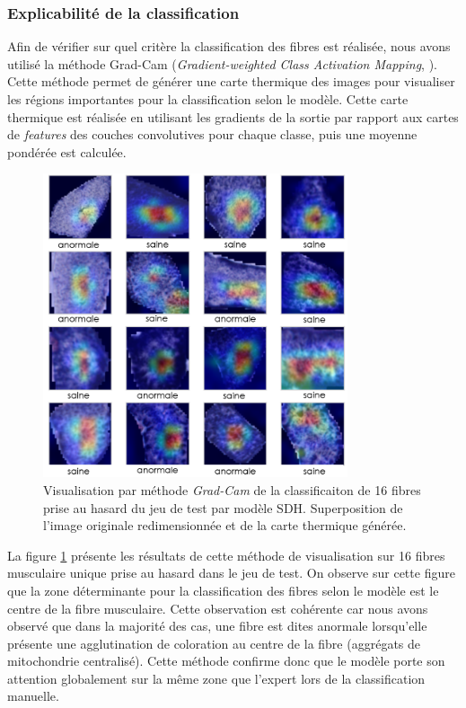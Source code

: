 \subsubsection{Explicabilité de la classification}
Afin de vérifier sur quel critère la classification des fibres est réalisée, nous avons utilisé la méthode Grad-Cam (\textit{Gradient-weighted Class Activation Mapping}, \cite{selvaraju_grad-cam_2020}). Cette méthode permet de générer une carte thermique des images pour visualiser les régions importantes pour la classification selon le modèle. Cette carte thermique est réalisée en utilisant les gradients de la sortie par rapport aux cartes de \textit{features} des couches convolutives pour chaque classe, puis une moyenne pondérée est calculée.

\begin{figure}[htbp]
 \centering
 \includegraphics[width=0.8\textwidth]{figures/sdh_gradcam.png}
 \caption[Visualisation par méthode \textit{Grad-Cam} du modèle SDH]{Visualisation par méthode  \textit{Grad-Cam} de la classificaiton de 16 fibres prise au hasard du jeu de test par modèle SDH. Superposition de l'image originale redimensionnée et de la carte thermique générée.}
 \label{fig:gradcam_sdh}
\end{figure}
La figure \ref{fig:gradcam_sdh} présente les résultats de cette méthode de visualisation sur 16 fibres musculaire unique prise au hasard dans le jeu de test. On observe sur cette figure que la zone déterminante pour la classification des fibres selon le modèle est le centre de la fibre musculaire. Cette observation est cohérente car nous avons observé que dans la majorité des cas, une fibre est dites anormale lorsqu'elle présente une agglutination de coloration au centre de la fibre (aggrégats de mitochondrie centralisé). Cette méthode confirme donc que le modèle porte son attention globalement sur la même zone que l'expert lors de la classification manuelle. 

